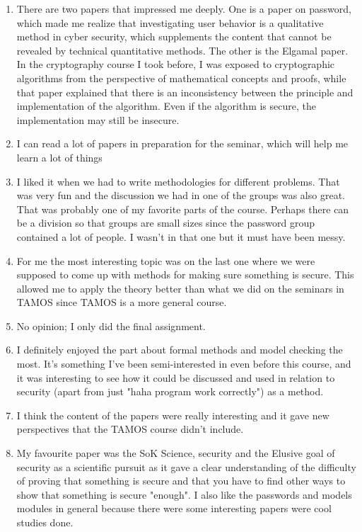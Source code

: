\documentclass[a4paper]{report}
\begin{document}
\begin{enumerate}
  \item There are two papers that impressed me deeply. One is a paper on password, which made me realize that investigating user behavior is a qualitative method in cyber security, which supplements the content that cannot be revealed by technical quantitative methods. The other is the Elgamal paper. In the cryptography course I took before, I was exposed to cryptographic algorithms from the perspective of mathematical concepts and proofs, while that paper explained that there is an inconsistency between the principle and implementation of the algorithm. Even if the algorithm is secure, the implementation may still be insecure.
  \item I can read a lot of papers in preparation for the seminar, which will help me learn a lot of things
  \item I liked it when we had to write methodologies for different problems. That was very fun and the discussion we had in one of the groups was also great. That was probably one of my favorite parts of the course. Perhaps there can be a division so that groups are small sizes since the password group contained a lot of people. I wasn't in that one but it must have been messy. 
  \item For me the most interesting topic was on the last one where we were supposed to come up with methods for making sure something is secure. This allowed me to apply the theory better than what we did on the seminars in TAMOS since TAMOS is a more general course. 
  \item No opinion; I only did the final assignment.
  \item I definitely enjoyed the part about formal methods and model checking the most. It's something I've been semi-interested in even before this course, and it was interesting to see how it could be discussed and used in relation to security (apart from just "haha program work correctly") as a method.
  \item I think the content of the papers were really interesting and it gave new perspectives that the TAMOS course didn't include.
  \item My favourite paper was the SoK Science, security and the Elusive goal of security as a scientific pursuit as it gave a clear understanding of the difficulty of proving that something is secure and that you have to find other ways to show that something is secure "enough". I also like the passwords and models modules in general because there were some interesting papers were cool studies done. 

\end{enumerate}
\end{document}
